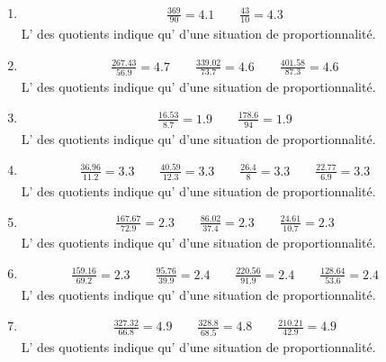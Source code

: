 {\begin{enumerate}
\item\begin{align*}
\frac{369}{90} = 4.1\qquad \frac{43}{10} = 4.3\qquad 
\end{align*}
L' des quotients indique qu' d'une situation de proportionnalité.

\item\begin{align*}
\frac{267.43}{56.9} = 4.7\qquad \frac{339.02}{73.7} = 4.6\qquad \frac{401.58}{87.3} = 4.6\qquad 
\end{align*}
L' des quotients indique qu' d'une situation de proportionnalité.

\item\begin{align*}
\frac{16.53}{8.7} = 1.9\qquad \frac{178.6}{94} = 1.9\qquad 
\end{align*}
L' des quotients indique qu' d'une situation de proportionnalité.

\item\begin{align*}
\frac{36.96}{11.2} = 3.3\qquad \frac{40.59}{12.3} = 3.3\qquad \frac{26.4}{8} = 3.3\qquad \frac{22.77}{6.9} = 3.3\qquad 
\end{align*}
L' des quotients indique qu' d'une situation de proportionnalité.

\item\begin{align*}
\frac{167.67}{72.9} = 2.3\qquad \frac{86.02}{37.4} = 2.3\qquad \frac{24.61}{10.7} = 2.3\qquad 
\end{align*}
L' des quotients indique qu' d'une situation de proportionnalité.

\item\begin{align*}
\frac{159.16}{69.2} = 2.3\qquad \frac{95.76}{39.9} = 2.4\qquad \frac{220.56}{91.9} = 2.4\qquad \frac{128.64}{53.6} = 2.4\qquad 
\end{align*}
L' des quotients indique qu' d'une situation de proportionnalité.

\item\begin{align*}
\frac{327.32}{66.8} = 4.9\qquad \frac{328.8}{68.5} = 4.8\qquad \frac{210.21}{42.9} = 4.9\qquad 
\end{align*}
L' des quotients indique qu' d'une situation de proportionnalité.


\end{enumerate}}
